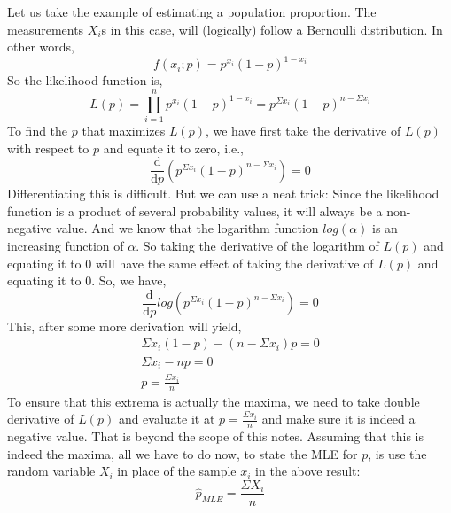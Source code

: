 Let us take the example of estimating a population proportion. The measurements $X_i$s in this case, will (logically) follow a Bernoulli distribution. In other words,
	\[ f(x_i;p) = p^{x_i}(1-p)^{1-x_i} \]
So the likelihood function is,
	\[ L(p) = \prod_{i=1}^{n} p^{x_i}(1-p)^{1-x_i} = p^{\Sigma x_i}(1-p)^{n - \Sigma x_i} \]
To find the $p$ that maximizes $L(p)$, we have first take the derivative of $L(p)$ with respect to $p$ and equate it to zero, i.e., 
	\[ \frac{\mathrm d}{\mathrm d p} (p^{\Sigma x_i}(1-p)^{n - \Sigma x_i}) = 0 \]
Differentiating this is difficult. But we can use a neat trick: Since the likelihood function is a product of several probability values, it will always be a non-negative value. And we know that the logarithm function $log(\alpha)$ is an increasing function of $\alpha$. So taking the derivative of the logarithm of $L(p)$ and equating it to 0 will have the same effect of taking the derivative of $L(p)$ and equating it to 0. So, we have,
	\[ \frac{\mathrm d}{\mathrm d p} log (p^{\Sigma x_i}(1-p)^{n - \Sigma x_i}) = 0 \]
This, after some more derivation will yield,
	\begin{align*}
		 \Sigma x_i (1 - p) - (n - \Sigma x_i)p = 0 \\
		 \Sigma x_i - np = 0 \\
		 p = \frac{\Sigma x_i}{n}
	\end{align*}
To ensure that this extrema is actually the maxima, we need to take double derivative of $L(p)$ and evaluate it at $p = \frac{\Sigma x_i}{n}$ and make sure it is indeed a negative value. That is beyond the scope of this notes. Assuming that this is indeed the maxima, all we have to do now, to state the MLE for $p$, is use the random variable $X_i$ in place of the sample $x_i$ in the above result:
	\[\hat{p}_{MLE} = \frac{\Sigma X_i}{n} \]

